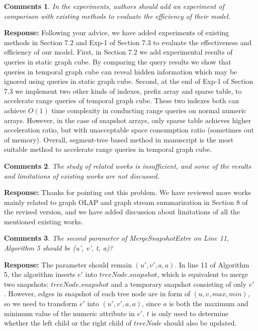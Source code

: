 \documentclass{article}
\newtheorem{Comments}{\textbf{Comments}}
\begin{document}
\begin{Comments}
In the experiments, authors should add an experiment of comparison with existing methods to evaluate the efficiency of their model.
\end{Comments}
\noindent \textbf{Response:} Following your advice, we have added experiments of existing methods in Section 7.2 and Exp-1 of Section 7.3 to evaluate the effectiveness and efficiency of our model. First, in Section 7.2 we add experimental results of queries in static graph cube. By comparing the query results we show that queries in temporal graph cube can reveal hidden information which may be ignored using queries in static graph cube. Second, at the end of Exp-1 of Section 7.3 we implement two other kinds of indexes, prefix array and sparse table, to accelerate range queries of temporal graph cube. These two indexes both can achieve $ O(1) $ time complexity in conducting range queries on normal numeric arrays. However, in the case of snapshot arrays, only sparse table achieves higher acceleration ratio, but with unacceptable space consumption ratio (sometimes out of memory). Overall, segment-tree based method in manuscript is the most suitable method to accelerate range queries in temporal graph cube.

\begin{Comments}
The study of related works is insufficient, and some of the results and limitations of existing works are not discussed.
\end{Comments}
\noindent \textbf{Response:} Thanks for pointing out this problem. We have reviewed more works mainly related to graph OLAP and graph stream summarization in Section 8 of the revised version, and we have added discussion about limitations of all the mentioned existing works.

\begin{Comments}
The second parameter of MergeSnapshotExtre on Line 11, Algorithm 5 should be (u’, v’, t, a)?
\end{Comments}
\noindent \textbf{Response:} The parameter should remain $ (u',v',a,a) $. In line 11 of Algorithm 5, the algorithm inserts $ e' $ into $ treeNode.snapshot $, which is equivalent to merge two snapshots: $ treeNode.snapshot $ and a temporary snapshot consisting of only $ e' $. However, edges in snapshot of each tree node are in form of $ (u,v,max,min) $, so we need to transform $ e' $ into $ (u',v',a,a) $, since $ a $ is both the maximum and minimum value of the numeric attribute in $ e' $. $ t $ is only used to determine whether the left child or the right child of $ treeNode $ should also be updated.
\end{document}
